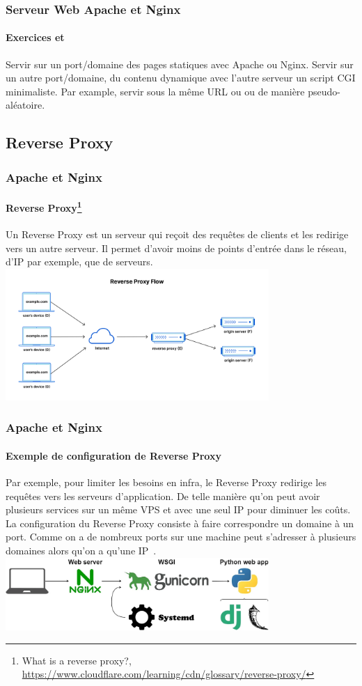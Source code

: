 \documentclass{beamer}
\begin{document}
    \begin{frame}
        \transdissolve
        \frametitle{Serveur Web Apache et Nginx}
        \framesubtitle{Exercices \execcounterdispinc{} et \execcounterdispinc{}}
        Servir sur un port/domaine des pages statiques avec Apache ou Nginx.
        \bigbreak
        Servir sur un autre port/domaine, du contenu dynamique avec l'autre serveur un script CGI minimaliste.
        Par example, servir sous la même URL  ou  ou  de manière pseudo-aléatoire.
    \end{frame}

    \subsection{Reverse Proxy}\label{subsec:reverse-proxy}

    \begin{frame}
        \transdissolve
        \frametitle{Apache et Nginx}
        \framesubtitle{Reverse Proxy\footnote{What is a reverse proxy?, \url{https://www.cloudflare.com/learning/cdn/glossary/reverse-proxy/}}}
        Un Reverse Proxy est un serveur qui reçoit des requêtes de clients et les redirige vers un autre serveur.
        Il permet d'avoir moins de points d'entrée dans le réseau, d'IP par exemple, que de serveurs.
        \bigbreak
        \centering
        \includegraphics[width=10cm]{image/reverse-proxy-flow}
    \end{frame}

    \begin{frame}
        \transdissolve
        \frametitle{Apache et Nginx}
        \framesubtitle{Exemple de configuration de Reverse Proxy}
        Par exemple, pour limiter les besoins en infra, le Reverse Proxy redirige les requêtes vers les serveurs d'application.
        De telle manière qu'on peut avoir plusieurs services sur un même VPS et avec une seul IP pour diminuer les coûts.
        \bigbreak
        La configuration du Reverse Proxy consiste à faire correspondre un domaine à un port.
        Comme on a de nombreux ports sur une machine peut s'adresser à plusieurs domaines alors qu'on a qu'une IP~.
        \bigbreak
        \centering
        \includegraphics[width=10cm]{image/flask-gunicorn-nginx}
    \end{frame}
\end{document}

